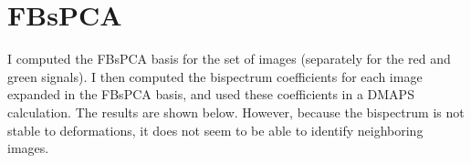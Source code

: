 \documentclass[12pt]{article}
\begin{document}




\section{FBsPCA}

I computed the FBsPCA basis for the set of images (separately for the red and green signals).
%
I then computed the bispectrum coefficients for each image expanded in the FBsPCA basis, and used these coefficients in a DMAPS calculation.
%
The results are shown below.
%
However, because the bispectrum is not stable to deformations, it does not seem to be able to identify neighboring images.
\end{document}
